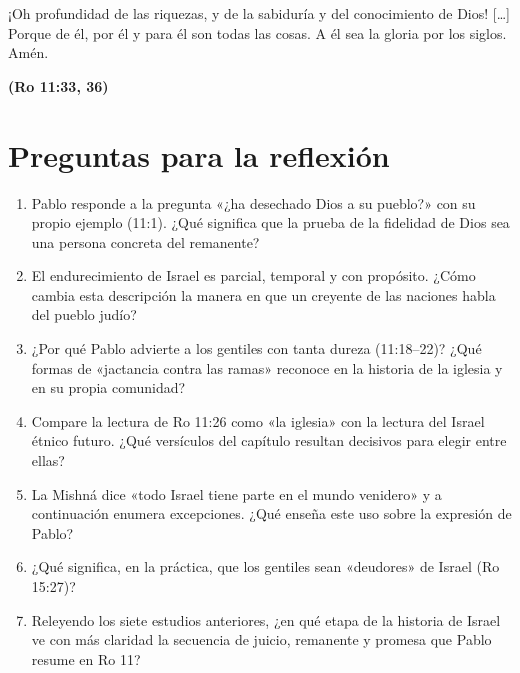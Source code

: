 \documentclass[11pt,letterpaper]{article}
\newcommand{\fuente}[1]{\par\hfill{\upshape\bfseries\small\textcolor{ladrillo}{#1}}}
\begin{document}
\begin{cita}¡Oh profundidad de las riquezas, y de la sabiduría y del conocimiento de Dios! [\ldots] Porque de él, por él y para él son todas las cosas. A él sea la gloria por los siglos. Amén.\fuente{(Ro 11:33, 36)}\end{cita}

\section*{Preguntas para la reflexión}
\begin{enumerate}
\item Pablo responde a la pregunta «¿ha desechado Dios a su pueblo?» con su propio ejemplo (11:1). ¿Qué significa que la prueba de la fidelidad de Dios sea una persona concreta del remanente?
\item El endurecimiento de Israel es parcial, temporal y con propósito. ¿Cómo cambia esta descripción la manera en que un creyente de las naciones habla del pueblo judío?
\item ¿Por qué Pablo advierte a los gentiles con tanta dureza (11:18--22)? ¿Qué formas de «jactancia contra las ramas» reconoce en la historia de la iglesia y en su propia comunidad?
\item Compare la lectura de Ro 11:26 como «la iglesia» con la lectura del Israel étnico futuro. ¿Qué versículos del capítulo resultan decisivos para elegir entre ellas?
\item La Mishná dice «todo Israel tiene parte en el mundo venidero» y a continuación enumera excepciones. ¿Qué enseña este uso sobre la expresión de Pablo?
\item ¿Qué significa, en la práctica, que los gentiles sean «deudores» de Israel (Ro 15:27)?
\item Releyendo los siete estudios anteriores, ¿en qué etapa de la historia de Israel ve con más claridad la secuencia de juicio, remanente y promesa que Pablo resume en Ro 11?
\end{enumerate}
\end{document}
